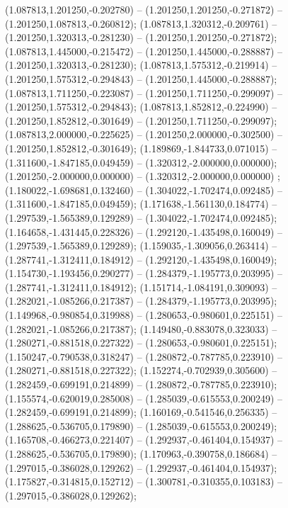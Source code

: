  (1.087813,1.201250,-0.202780) -- (1.201250,1.201250,-0.271872) -- (1.201250,1.087813,-0.260812);
 (1.087813,1.320312,-0.209761) -- (1.201250,1.320313,-0.281230) -- (1.201250,1.201250,-0.271872);
 (1.087813,1.445000,-0.215472) -- (1.201250,1.445000,-0.288887) -- (1.201250,1.320313,-0.281230);
 (1.087813,1.575312,-0.219914) -- (1.201250,1.575312,-0.294843) -- (1.201250,1.445000,-0.288887);
 (1.087813,1.711250,-0.223087) -- (1.201250,1.711250,-0.299097) -- (1.201250,1.575312,-0.294843);
 (1.087813,1.852812,-0.224990) -- (1.201250,1.852812,-0.301649) -- (1.201250,1.711250,-0.299097);
 (1.087813,2.000000,-0.225625) -- (1.201250,2.000000,-0.302500) -- (1.201250,1.852812,-0.301649);
 (1.189869,-1.844733,0.071015) -- (1.311600,-1.847185,0.049459) -- (1.320312,-2.000000,0.000000);
 (1.201250,-2.000000,0.000000) -- (1.320312,-2.000000,0.000000) ;
 (1.180022,-1.698681,0.132460) -- (1.304022,-1.702474,0.092485) -- (1.311600,-1.847185,0.049459);
 (1.171638,-1.561130,0.184774) -- (1.297539,-1.565389,0.129289) -- (1.304022,-1.702474,0.092485);
 (1.164658,-1.431445,0.228326) -- (1.292120,-1.435498,0.160049) -- (1.297539,-1.565389,0.129289);
 (1.159035,-1.309056,0.263414) -- (1.287741,-1.312411,0.184912) -- (1.292120,-1.435498,0.160049);
 (1.154730,-1.193456,0.290277) -- (1.284379,-1.195773,0.203995) -- (1.287741,-1.312411,0.184912);
 (1.151714,-1.084191,0.309093) -- (1.282021,-1.085266,0.217387) -- (1.284379,-1.195773,0.203995);
 (1.149968,-0.980854,0.319988) -- (1.280653,-0.980601,0.225151) -- (1.282021,-1.085266,0.217387);
 (1.149480,-0.883078,0.323033) -- (1.280271,-0.881518,0.227322) -- (1.280653,-0.980601,0.225151);
 (1.150247,-0.790538,0.318247) -- (1.280872,-0.787785,0.223910) -- (1.280271,-0.881518,0.227322);
 (1.152274,-0.702939,0.305600) -- (1.282459,-0.699191,0.214899) -- (1.280872,-0.787785,0.223910);
 (1.155574,-0.620019,0.285008) -- (1.285039,-0.615553,0.200249) -- (1.282459,-0.699191,0.214899);
 (1.160169,-0.541546,0.256335) -- (1.288625,-0.536705,0.179890) -- (1.285039,-0.615553,0.200249);
 (1.165708,-0.466273,0.221407) -- (1.292937,-0.461404,0.154937) -- (1.288625,-0.536705,0.179890);
 (1.170963,-0.390758,0.186684) -- (1.297015,-0.386028,0.129262) -- (1.292937,-0.461404,0.154937);
 (1.175827,-0.314815,0.152712) -- (1.300781,-0.310355,0.103183) -- (1.297015,-0.386028,0.129262);
